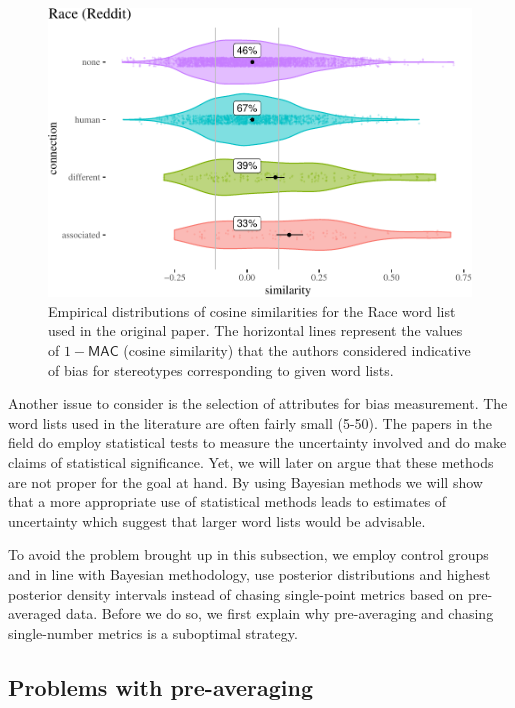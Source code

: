 \documentclass{clv3}
\begin{document}
\begin{figure}

\begin{center}\includegraphics[width=0.7\linewidth]{figures/figcosineDistributions8dg} \end{center}

\caption{Empirical distributions of cosine similarities  for the Race word list used in  the original paper.  The
	horizontal lines represent the values of \(1 - \mathsf{MAC}\) (cosine similarity) that the authors considered indicative of bias for stereotypes corresponding to given word lists. }

\label{fig:empirical3}
\end{figure}

Another issue to consider is the selection of attributes for bias
measurement. The word lists used in the literature are often fairly
small (5-50). The papers in the field do employ statistical tests to
measure the uncertainty involved and do make claims of statistical
significance. Yet, we will later on argue that these methods are not
proper for the goal at hand. By using Bayesian methods we will show that
a more appropriate use of statistical methods leads to estimates of
uncertainty which suggest that larger word lists would be advisable.

To avoid the problem brought up in this subsection, we employ control
groups and in line with Bayesian methodology, use posterior
distributions and highest posterior density intervals instead of chasing
single-point metrics based on pre-averaged data. Before we do so, we
first explain why pre-averaging and chasing single-number metrics is a
suboptimal strategy.









\hypertarget{problems-with-pre-averaging}{%
\subsection{Problems with
pre-averaging}\label{problems-with-pre-averaging}}
\end{document}
